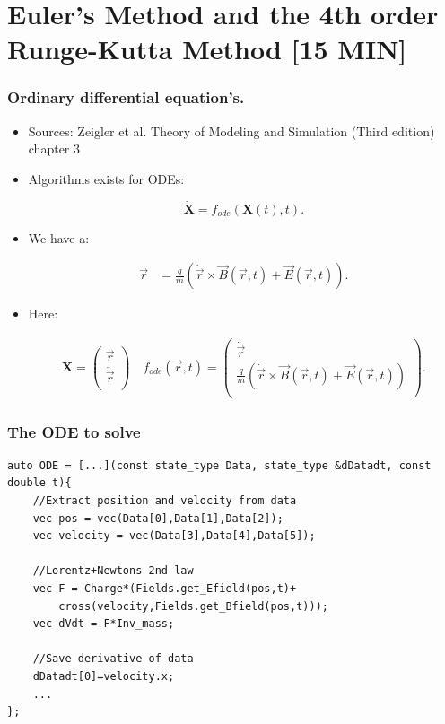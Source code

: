 \documentclass{beamer}
\newcommand{\mvec}[2]{
\ensuremath{\left(
\begin{array}{c}
#1\\
#2\\
\end{array}
\right)}
}
\begin{document}
\section{Euler's Method and the 4th order Runge-Kutta Method [15 MIN]}

\begin{frame}
\frametitle{Ordinary differential equation's.}
\begin{itemize}
\item<1-> {\color{gray} Sources: Zeigler et al. Theory of Modeling and Simulation (Third edition) chapter 3}

\item<1-> Algorithms exists for ODEs:

\begin{equation*}
\dot{\mathbf{X}} = f_{ode}(\mathbf{X}(t),t).
\end{equation*}

\item<2-> We have a:

\begin{align*}
\ddot{\vec{r}} &= \frac{q}{m} ( \dot{\vec{r}}\times \vec{B}(\vec{r},t)+\vec{E}(\vec{r},t)).
\end{align*}

\item<3-> Here:

\begin{align*}
\mathbf{X} = \mvec{\vec{r}}{\dot{\vec{r}}} \quad f_{ode}(\vec{r},t) = \mvec{\dot{\vec{r}}}{\frac{q}{m} ( \dot{\vec{r}}\times \vec{B}(\vec{r},t)+\vec{E}(\vec{r},t))}.
\end{align*}
\end{itemize}
\end{frame}

\newif\ifadditional
\additionaltrue

\ifadditional
\begin{frame}[fragile]
\frametitle{The ODE to solve}
\begin{lstlisting}
auto ODE = [...](const state_type Data, state_type &dDatadt, const double t){
    //Extract position and velocity from data
    vec pos = vec(Data[0],Data[1],Data[2]);
    vec velocity = vec(Data[3],Data[4],Data[5]);

    //Lorentz+Newtons 2nd law
    vec F = Charge*(Fields.get_Efield(pos,t)+
        cross(velocity,Fields.get_Bfield(pos,t)));
    vec dVdt = F*Inv_mass;

    //Save derivative of data
    dDatadt[0]=velocity.x;
    ...
};
\end{lstlisting}
\end{frame}
\fi
\end{document}
